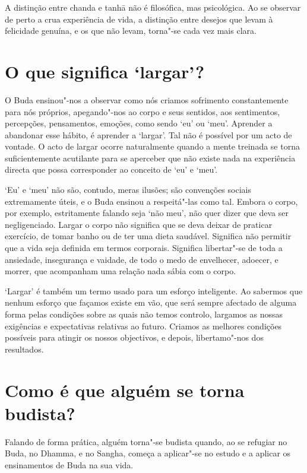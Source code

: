 A distinção entre chanda e tanhā não é filosófica, mas psicológica. Ao
se observar de perto a crua experiência de vida, a distinção entre
desejos que levam à felicidade genuína, e os que não levam, torna"-se
cada vez mais clara.

\section{O que significa `largar'?}

O Buda ensinou"-nos a observar como nós criamos sofrimento constantemente
para nós próprios, apegando"-nos ao corpo e seus sentidos, aos
sentimentos, percepções, pensamentos, emoções, como sendo `eu' ou `meu'.
Aprender a abandonar esse hábito, é aprender a `largar'. Tal não é
possível por um acto de vontade. O acto de largar ocorre naturalmente
quando a mente treinada se torna suficientemente acutilante para se
aperceber que não existe nada na experiência directa que possa
corresponder ao conceito de `eu' e `meu'.

`Eu' e `meu' não são, contudo, meras ilusões; são convenções sociais
extremamente úteis, e o Buda ensinou a respeitá"-las como tal. Embora o
corpo, por exemplo, estritamente falando seja `não meu', não quer dizer
que deva ser negligenciado. Largar o corpo não significa que se deva
deixar de praticar exercício, de tomar banho ou de ter uma dieta
saudável. Significa não permitir que a vida seja definida em termos
corporais. Significa libertar"-se de toda a ansiedade, insegurança e
vaidade, de todo o medo de envelhecer, adoecer, e morrer, que acompanham
uma relação nada sábia com o corpo.

`Largar' é também um termo usado para um esforço inteligente. Ao
sabermos que nenhum esforço que façamos existe em vão, que será sempre
afectado de alguma forma pelas condições sobre as quais não temos
controlo, largamos as nossas exigências e expectativas relativas ao
futuro. Criamos as melhores condições possíveis para atingir os nossos
objectivos, e depois, libertamo"-nos dos resultados.

\section{Como é que alguém se torna budista?}

Falando de forma prática, alguém torna"-se budista quando, ao se refugiar
no Buda, no Dhamma, e no Sangha, começa a aplicar"-se no estudo e a
aplicar os ensinamentos de Buda na sua vida.

